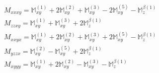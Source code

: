 \documentclass[fleqn,8pt,landscape]{jsarticle}
\begin{document}
\begin{align*}
& M_{xxxy} = \mathbb{M}_{xy}^{(1)} + 2 \mathbb{M}_{xy}^{(2)} + \mathbb{M}_{xy}^{(3)} - 2 \mathbb{M}_{xy}^{(5)} - \mathbb{M}_{z}^{\beta(1)} \\
& M_{zzxy} = \mathbb{M}_{xy}^{(1)} + \mathbb{M}_{xy}^{(3)} + 2 \mathbb{M}_{z}^{\beta(1)} \\
& M_{xxyx} = \mathbb{M}_{xy}^{(1)} + 2 \mathbb{M}_{xy}^{(2)} + \mathbb{M}_{xy}^{(3)} + 2 \mathbb{M}_{xy}^{(5)} - \mathbb{M}_{z}^{\beta(1)} \\
& M_{yzzx} = \mathbb{M}_{xy}^{(2)} - \mathbb{M}_{xy}^{(5)} + 2 \mathbb{M}_{z}^{\beta(1)} \\
& M_{xyyy} = \mathbb{M}_{xy}^{(1)} + 2 \mathbb{M}_{xy}^{(2)} - \mathbb{M}_{xy}^{(3)} - \mathbb{M}_{z}^{\beta(1)}
\end{align*}
\end{document}
